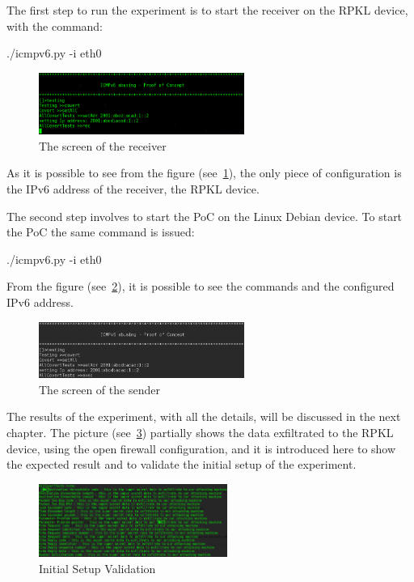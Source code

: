\documentclass[12pt]{article}
\begin{document}
The first step to run the experiment is to start the receiver on the RPKL device, with the command:

./icmpv6.py -i eth0


\begin{figure}[ht] 
\begin{center}
\includegraphics[width=0.6\textwidth]{runExpReceiver}
\caption{The screen of the receiver}
\label{fig:runExpRec}
\end{center}
\end{figure}

As it is possible to see from the figure (see~\ref{fig:runExpRec}), the only piece of configuration is the IPv6 address of the receiver, the RPKL device.

The second step involves to start the PoC on the Linux Debian device. To start the PoC the same command is issued:

./icmpv6.py -i eth0

From the figure (see~\ref{fig:runExpSend}), it is possible to see the commands and the configured IPv6 address.

\begin{figure}[ht] 
\begin{center}
\includegraphics[width=0.6\textwidth]{runExpSender}
\caption{The screen of the sender}
\label{fig:runExpSend}
\end{center}
\end{figure}

The results of the experiment, with all the details, will be discussed in the next chapter. The picture (see~\ref{fig:initialSetupVal}) partially shows the data exfiltrated to the RPKL device, using the open firewall configuration, and it is introduced here to show the expected result and to validate the initial setup of the experiment.

\begin{figure}[ht] 
\begin{center}
\includegraphics[width=0.55\textwidth]{initialSetupVal}
\caption{Initial Setup Validation}
\label{fig:initialSetupVal}
\end{center}
\end{figure}
\end{document}
